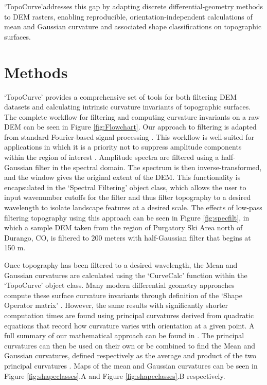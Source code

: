 \documentclass[esurf, manuscript]{copernicus}
\begin{document}
`TopoCurve'addresses this gap by adapting discrete differential‐geometry methods to DEM rasters, enabling reproducible, orientation‐independent calculations of mean and Gaussian curvature and associated shape classifications on topographic surfaces.


\section{Methods}
`TopoCurve' provides a comprehensive set of tools for both filtering DEM datasets and calculating intrinsic curvature invariants of topographic surfaces. The complete workflow for filtering and computing curvature invariants on a raw DEM can be seen in Figure \ref{fig:Flowchart}. Our approach to filtering is adapted from standard Fourier-based signal processing \citep{perron2008spectral-334}.  This workflow is well-suited for applications in which it is a priority not to suppress amplitude components within the region of interest \citep{Mcnutt1983,klema2025discrete-964}. Amplitude spectra are filtered using a half-Gaussian filter in the spectral domain. The spectrum is then inverse-transformed, and the window gives the original extent of the DEM.  This functionality is encapsulated in the `Spectral Filtering' object class, which allows the user to input wavenumber cutoffs for the filter and thus filter topography to a desired wavelength to isolate landscape features at a desired scale.  The effects of low-pass filtering topography using this approach can be seen in Figure \ref{fig:specfilt}, in which a sample DEM taken from the region of Purgatory Ski Area north of Durango, CO, is filtered to $200$ meters with half-Gaussian filter that begins at 150 m.

Once topography has been filtered to a desired wavelength, the Mean and Gaussian curvatures are calculated using the `CurveCalc' function within the `TopoCurve' object class. Many modern differential geometry approaches compute these surface curvature invariants through definition of the `Shape Operator matrix' \citep{Oneill2006diffgeometry,mynatt2007using-ba6}.  However, the same results with significantly shorter computation times are found using principal curvatures derived from quadratic equations that record how curvature varies with orientation at a given point.  A full summary of our mathematical approach can be found in \citep{klema2025discrete-964}. The principal curvatures can then be used on their own or be combined to find the Mean and Gaussian curvatures, defined respectively as the average and product of the two principal curvatures \citep{bergbauer2003how-56b}.  Maps of the mean and Gaussian curvatures can be seen in Figure \ref{fig:shapeclasses}.A and Figure \ref{fig:shapeclasses}.B respectively.\\
\end{document}
